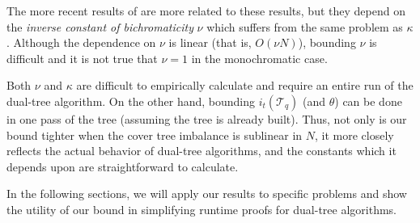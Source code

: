 The more recent results of \citet{curtin2014dual} are more related to these
results, but they depend on the {\it inverse constant of bichromaticity} $\nu$
which suffers from the same problem as $\kappa$.  Although the dependence on
$\nu$ is linear (that is, $O(\nu N)$), bounding $\nu$ is difficult and it is not
true that $\nu = 1$ in the monochromatic case.

Both $\nu$ and $\kappa$ are difficult to empirically calculate and require an
entire run of the dual-tree algorithm.  On the other hand, bounding
$i_t(\mathscr{T}_q)$ (and $\theta$) can be done in one pass of the tree
(assuming the tree is already built).  Thus, not only is our bound tighter when
the cover tree imbalance is sublinear in $N$, it more closely reflects the
actual behavior of dual-tree algorithms, and the constants which it depends upon
are straightforward to calculate.

In the following sections, we will apply our results to specific problems and
show the utility of our bound in simplifying runtime proofs for dual-tree
algorithms.




